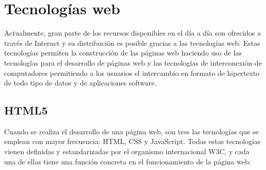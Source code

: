 \section{Tecnologías web}
\label{sec:tecnologias_web}

Actualmente, gran parte de los recursos disponibles en el día a día son ofrecidos a través de Internet y su distribución es posible gracias a las tecnologías web. Estas tecnologías permiten la construcción de las páginas web haciendo uso de las tecnologías para el desarrollo de páginas web y las tecnologías de interconexión de computadores permitiendo a los usuarios el intercambio en formato de hipertexto de todo tipo de datos y de aplicaciones software.

\subsection{HTML5}
\label{sec:html5}

Cuando se realiza el desarrollo de una página web, son tres las tecnologías que se emplean con mayor frecuencia: HTML, CSS y JavaScript. Todas estas tecnologías vienen definidas y estandarizadas por el organismo internacional W3C, y cada una de ellas tiene una función concreta en el funcionamiento de la página web:

